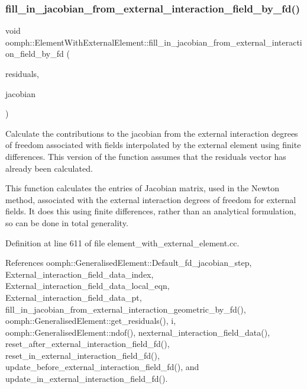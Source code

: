 \subsubsection{\texorpdfstring{fill\+\_\+in\+\_\+jacobian\+\_\+from\+\_\+external\+\_\+interaction\+\_\+field\+\_\+by\+\_\+fd()}{fill\_in\_jacobian\_from\_external\_interaction\_field\_by\_fd()}\hspace{0.1cm}{\footnotesize\ttfamily [1/2]}}
{\footnotesize\ttfamily void oomph\+::\+Element\+With\+External\+Element\+::fill\+\_\+in\+\_\+jacobian\+\_\+from\+\_\+external\+\_\+interaction\+\_\+field\+\_\+by\+\_\+fd (\begin{DoxyParamCaption}\item[{\hyperlink{classoomph_1_1Vector}{Vector}$<$ double $>$ \&}]{residuals,  }\item[{\hyperlink{classoomph_1_1DenseMatrix}{Dense\+Matrix}$<$ double $>$ \&}]{jacobian }\end{DoxyParamCaption})\hspace{0.3cm}{\ttfamily [protected]}}



Calculate the contributions to the jacobian from the external interaction degrees of freedom associated with fields interpolated by the external element using finite differences. This version of the function assumes that the residuals vector has already been calculated. 

This function calculates the entries of Jacobian matrix, used in the Newton method, associated with the external interaction degrees of freedom for external fields. It does this using finite differences, rather than an analytical formulation, so can be done in total generality. 

Definition at line 611 of file element\+\_\+with\+\_\+external\+\_\+element.\+cc.



References oomph\+::\+Generalised\+Element\+::\+Default\+\_\+fd\+\_\+jacobian\+\_\+step, External\+\_\+interaction\+\_\+field\+\_\+data\+\_\+index, External\+\_\+interaction\+\_\+field\+\_\+data\+\_\+local\+\_\+eqn, External\+\_\+interaction\+\_\+field\+\_\+data\+\_\+pt, fill\+\_\+in\+\_\+jacobian\+\_\+from\+\_\+external\+\_\+interaction\+\_\+geometric\+\_\+by\+\_\+fd(), oomph\+::\+Generalised\+Element\+::get\+\_\+residuals(), i, oomph\+::\+Generalised\+Element\+::ndof(), nexternal\+\_\+interaction\+\_\+field\+\_\+data(), reset\+\_\+after\+\_\+external\+\_\+interaction\+\_\+field\+\_\+fd(), reset\+\_\+in\+\_\+external\+\_\+interaction\+\_\+field\+\_\+fd(), update\+\_\+before\+\_\+external\+\_\+interaction\+\_\+field\+\_\+fd(), and update\+\_\+in\+\_\+external\+\_\+interaction\+\_\+field\+\_\+fd().



